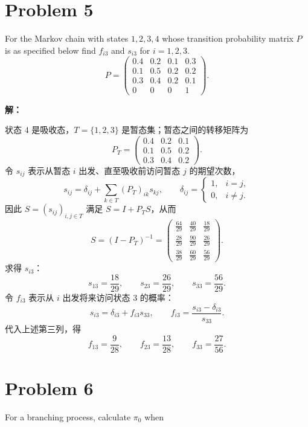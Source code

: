 \documentclass[12pt,a4paper]{article}
\begin{document}
\section{Problem 5}
For the Markov chain with states $1,2,3,4$ whose transition probability matrix $P$ is as specified below find $f_{i3}$ and $s_{i3}$ for $i=1,2,3$.
\[
P=\begin{pmatrix}
0.4&0.2&0.1&0.3\\
0.1&0.5&0.2&0.2\\
0.3&0.4&0.2&0.1\\
0&0&0&1
\end{pmatrix}.
\]

\begin{answerbox}
\textbf{解：}

状态 $4$ 是吸收态，$T=\{1,2,3\}$ 是暂态集；暂态之间的转移矩阵为
\[
P_T=\begin{pmatrix}
0.4&0.2&0.1\\
0.1&0.5&0.2\\
0.3&0.4&0.2
\end{pmatrix}.
\]
令 $s_{ij}$ 表示从暂态 $i$ 出发、直至吸收前访问暂态 $j$ 的期望次数，
\[
s_{ij}=\delta_{ij}+\sum_{k\in T}(P_T)_{ik}s_{kj},
\qquad
\delta_{ij}=\begin{cases}1,&i=j,\\0,&i\ne j.\end{cases}
\]
因此 $S=(s_{ij})_{i,j\in T}$ 满足 $S=I+P_T S$，从而
\[
S=(I-P_T)^{-1}
=\begin{pmatrix}
  \frac{64}{29} & \frac{40}{29} & \frac{18}{29}\\
  \frac{28}{29} & \frac{90}{29} & \frac{26}{29}\\
  \frac{38}{29} & \frac{60}{29} & \frac{56}{29}
\end{pmatrix}.
\]
求得 $s_{i3}$：
\[
s_{13}=\frac{18}{29},\qquad
s_{23}=\frac{26}{29},\qquad s_{33}=\frac{56}{29}.
\]
令 $f_{i3}$ 表示从 $i$ 出发将来访问状态 $3$ 的概率：
\[
s_{i3}=\delta_{i3}+f_{i3}s_{33},
\qquad
f_{i3}=\frac{s_{i3}-\delta_{i3}}{s_{33}}.
\]
代入上述第三列，得
\[
f_{13}=\frac{9}{28},\qquad
f_{23}=\frac{13}{28},\qquad f_{33}=\frac{27}{56}.
\]

\end{answerbox}

\section{Problem 6}
For a branching process, calculate $\pi_0$ when
\end{document}

